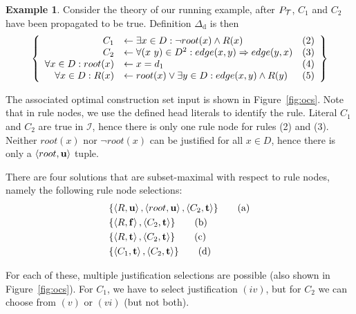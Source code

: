 \documentclass[11pt]{article}
\newcommand{\m}[1]{\ensuremath{#1}\xspace}
\newcommand{\trval}[1]{\m{{\bf #1}}}
\newcommand{\limplies}{\m{\Rightarrow}}
\newcommand{\lrule}{\m{\leftarrow}}
\newcommand{\ltrue}{\trval{t}}
\newcommand{\lfalse}{\trval{f}}
\newcommand{\lunkn}{\trval{u}}
\newcommand{\I}{\m{\mathcal{I}}}
\newcommand{\theory}{\m{\mathcal{T}}}
\newcommand{\D}{\m{\Delta}}
\newcommand{\typed}[2]{\m{#1\in #2:}}
\newcommand{\tuple}[1]{\m{\left \langle #1 \right \rangle }}
\theoremstyle{plain}
\theoremstyle{definition}
\theoremstyle{example_basic}
\newtheorem{example}[thm]{Example}
\theoremstyle{example_contd}
\theoremstyle{plain}
\newcommand{\Dd}{\ensuremath{\D_\text{d}}\xspace}
\newcommand{\pt}{\ensuremath{P_\text{\theory}}\xspace}
\newcommand{\change}[1]{#1}
\begin{document}
\begin{example}\label{ex:global}
Consider the theory of our running example, after \pt, $C_1$ and $C_2$ have been propagated to be true. Definition \Dd is then
\[\begin{array}{l}
\left\{\begin{array}{rlr}
C_1&\lrule \exists \typed{x}{D} \lnot \rt(x) \land R(x) & (2)\\
C_2&\lrule \forall \typed{(x~y)}{D^2} edge(x,y) \limplies edge(y,x)  & (3)\\
\forall \typed{x}{D} \rt(x)&\lrule x=d_1  & (4)\\
\forall \typed{x}{D} R(x)&\lrule \rt(x) \lor \exists \typed{y}{D} edge(x,y)\land R(y)  & (5)
\end{array}\right\}
\end{array}\]

The associated optimal construction set input is shown in
  Figure~\ref{fig:ocs}. \change{Note that in rule nodes, we use the defined head literals to identify the rule.} Literal $C_1$ and $C_2$ are true in \I, hence
  there is only one rule node for rules (2) and (3). Neither $root(x)$
  nor $\lnot root(x)$ can be justified for all $x \in D$, hence
  \change{there is only a  $\tuple{root, \lunkn}$ tuple.}

  There are four solutions that are subset-maximal with respect to rule nodes, namely the following rule node selections:
\begin{align*}
&\{\tuple{R,\lunkn},\tuple{root,\lunkn},\tuple{C_2,\ltrue}\} \tag{a}\label{rulenodea} \\
&\{\tuple{R,\lfalse},\tuple{C_2,\ltrue}\} \tag{b}\\
&\{\tuple{R,\ltrue},\tuple{C_2,\ltrue}\} \tag{c}\\
&\{\tuple{C_1,\ltrue},\tuple{C_2,\ltrue} \} \tag{d}
\end{align*}

For each of these, multiple justification selections are possible (also
shown in Figure~\ref{fig:ocs}). For $C_1$, we have to select justification
$(iv)$, but for $C_2$ we can choose from $(v)$ or $(vi)$ (but not both).

\begin{figure}
\centering
{}
\end{figure}
\end{example}
\end{document}
